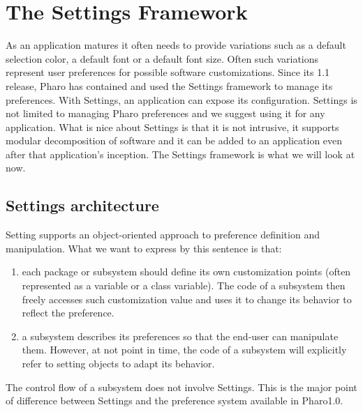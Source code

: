 \documentclass[a4paper,10pt,twoside]{book}
\begin{document}
\fi
\sloppy
\newcommand{\setbrowser}{\textit{Settings Browser}\xspace}

\chapter{The Settings Framework}

\chapterauthor{\authoralain{}}

As an application matures it often needs to provide variations such as
a default selection color, a default font or a default font size.
Often such variations represent user  preferences 
for possible software customizations. Since its 1.1 release, Pharo has contained and used
the Settings framework to manage its preferences. With Settings, an
application can expose its configuration. Settings is not limited to
managing Pharo preferences and we suggest using it for any
application. What is nice about Settings is that it is not intrusive,
it supports modular decomposition of software and it can be added to
an application even after that application's inception. The Settings
framework is what we will look at now.

\section{Settings architecture}

Setting supports an object-oriented approach to  preference definition and manipulation. What we want to express by this sentence is that:
\begin{enumerate}
\item each package or subsystem should define its own customization points (often represented as a variable or a class variable). The code of a subsystem then freely accesses such customization value and uses it to change its behavior to reflect the preference.
\item a subsystem describes its preferences so that the end-user can manipulate them. However, at not point in time, the code of a subsystem will explicitly refer to setting objects to adapt its behavior. 
\end{enumerate}

The control flow of a subsystem does not involve Settings. This is the major point of difference between Settings and the preference system available in Pharo1.0.
\end{document}
